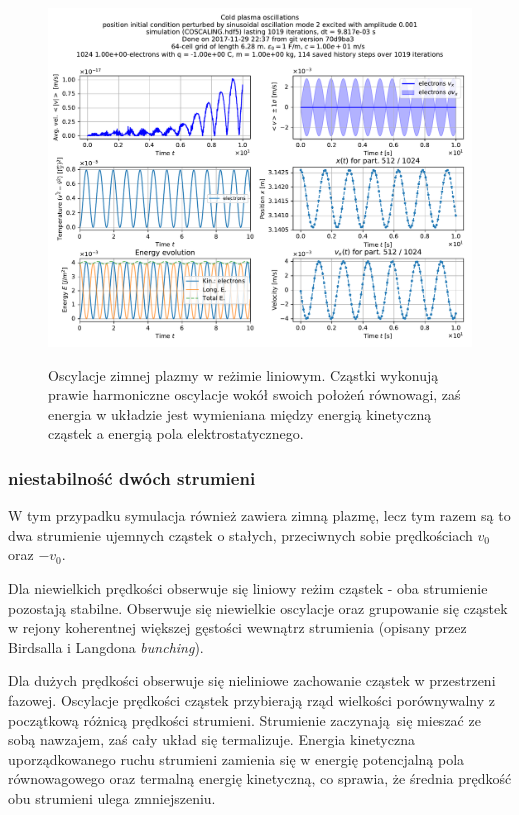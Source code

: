 \begin{figure}[h!]
  \includegraphics[width=\textwidth]{Images/COSCALING}
  \label{fig:coldplasma-linear}
  \caption{Oscylacje zimnej plazmy w reżimie liniowym. Cząstki wykonują prawie harmoniczne oscylacje wokół swoich położeń równowagi, zaś energia
    w układzie jest wymieniana między energią kinetyczną cząstek a energią pola elektrostatycznego.}
\end{figure}

    \subsubsection{niestabilność dwóch strumieni}
W tym przypadku symulacja również zawiera zimną plazmę, lecz tym razem są to dwa strumienie ujemnych cząstek
o stałych, przeciwnych sobie prędkościach $v_0$ oraz $-v_0$.

    Dla niewielkich prędkości  obserwuje się
    liniowy reżim cząstek - oba strumienie pozostają stabilne. Obserwuje się niewielkie oscylacje oraz
grupowanie się cząstek w rejony koherentnej większej gęstości wewnątrz strumienia (opisany przez Birdsalla i Langdona \emph{bunching}).

    Dla dużych prędkości  obserwuje się nieliniowe
    zachowanie cząstek w przestrzeni fazowej. Oscylacje prędkości cząstek przybierają rząd wielkości porównywalny
    z początkową różnicą prędkości strumieni.
 Strumienie zaczynają się mieszać ze sobą nawzajem, zaś cały układ się termalizuje. Energia kinetyczna
 uporządkowanego ruchu strumieni zamienia się w energię potencjalną pola równowagowego 
oraz termalną energię kinetyczną, co sprawia, że średnia prędkość obu strumieni ulega zmniejszeniu. 

